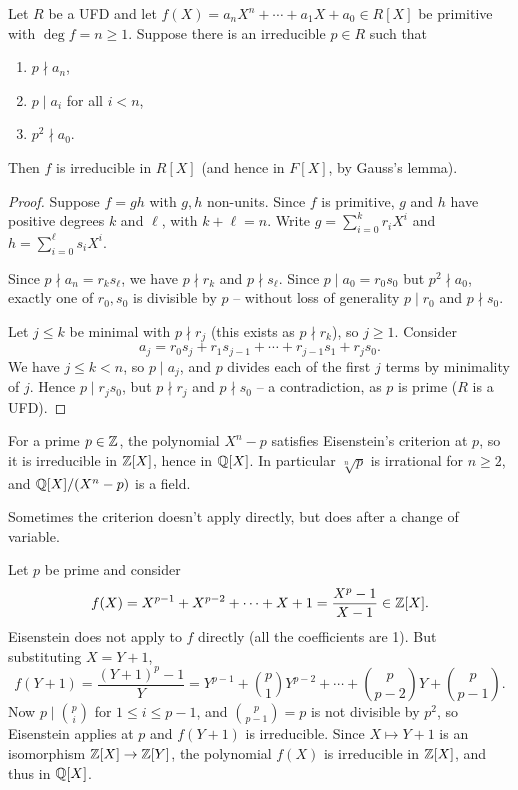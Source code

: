 \documentclass[a4paper]{scrartcl}
\begin{document}
\begin{theorem}
	Let $R$ be a UFD and let $f(X) = a_n X^n + \cdots + a_1 X + a_0 \in R[X]$ be primitive with $\deg f = n \geq 1$. Suppose there is an irreducible $p \in R$ such that
	\begin{enumerate}[label=(\roman*)]
		\item $p \nmid a_n$,
		\item $p \mid a_i$ for all $i < n$,
		\item $p^2 \nmid a_0$.
	\end{enumerate}
	Then $f$ is irreducible in $R[X]$ (and hence in $F[X]$, by Gauss's lemma).
\end{theorem}
\begin{proof}
	Suppose $f = gh$ with $g, h$ non-units. Since $f$ is primitive, $g$ and $h$ have positive degrees $k$ and $\ell$, with $k + \ell = n$. Write $g = \sum_{i=0}^{k} r_i X^i$ and $h = \sum_{i = 0}^{\ell} s_i X^i$.

	Since $p \nmid a_n = r_k s_\ell$, we have $p \nmid r_k$ and $p \nmid s_\ell$. Since $p \mid a_0 = r_0 s_0$ but $p^2 \nmid a_0$, exactly one of $r_0, s_0$ is divisible by $p$ -- without loss of generality $p \mid r_0$ and $p \nmid s_0$.

	Let $j \leq k$ be minimal with $p \nmid r_j$ (this exists as $p \nmid r_k$), so $j \geq 1$. Consider
	$$
	a_j = r_0 s_j + r_1 s_{j - 1} + \cdots + r_{j-1}s_1 + r_j s_0.
	$$
	We have $j \leq k < n$, so $p \mid a_j$, and $p$ divides each of the first $j$ terms by minimality of $j$. Hence $p \mid r_j s_0$, but $p \nmid r_j$ and $p \nmid s_0$ -- a contradiction, as $p$ is prime ($R$ is a UFD).
\end{proof}

\begin{example}
	For a prime $p \in \mathbb{Z}$, the polynomial $X^n - p$ satisfies Eisenstein's criterion at $p$, so it is irreducible in $\mathbb{Z}[X]$, hence in $\mathbb{Q}[X]$. In particular $\sqrt[n]{p}$ is irrational for $n \geq 2$, and $\mathbb{Q}[X]/(X^n - p)$ is a field.
\end{example}

Sometimes the criterion doesn't apply directly, but does after a change of variable.

\begin{example}
	Let $p$ be prime and consider
	$$
	f(X) = X^{p - 1} + X^{p - 2} + \cdots + X + 1 = \frac{X^p - 1}{X - 1} \in \mathbb{Z}[X].
	$$
	Eisenstein does not apply to $f$ directly (all the coefficients are 1). But substituting $X = Y + 1$,
	$$
	f(Y + 1) = \frac{(Y + 1)^p - 1}{Y} = Y^{p -1} + \binom{p}{1}Y^{p - 2} + \cdots + \binom{p}{p - 2}Y + \binom{p}{p - 1}.
	$$
	Now $p \mid \binom{p}{i}$ for $1 \leq i \leq p - 1$, and $\binom{p}{p-1} = p$ is not divisible by $p^2$, so Eisenstein applies at $p$ and $f(Y + 1)$ is irreducible. Since $X \mapsto Y + 1$ is an isomorphism $\mathbb{Z}[X] \rightarrow \mathbb{Z}[Y]$, the polynomial $f(X)$ is irreducible in $\mathbb{Z}[X]$, and thus in $\mathbb{Q}[X]$.
\end{example}
\end{document}
